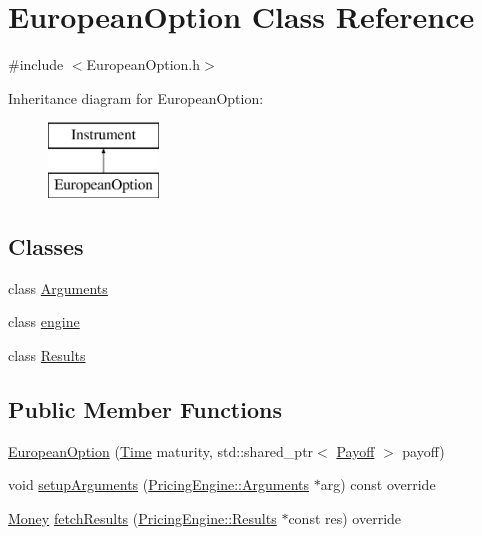 \hypertarget{class_european_option}{}\section{European\+Option Class Reference}
\label{class_european_option}


{\ttfamily \#include $<$European\+Option.\+h$>$}

Inheritance diagram for European\+Option\+:\begin{figure}[H]
\begin{center}
\leavevmode
\includegraphics[height=2.000000cm]{class_european_option}
\end{center}
\end{figure}
\subsection*{Classes}
\begin{DoxyCompactItemize}
\item 
class \hyperlink{class_european_option_1_1_arguments}{Arguments}
\item 
class \hyperlink{class_european_option_1_1engine}{engine}
\item 
class \hyperlink{class_european_option_1_1_results}{Results}
\end{DoxyCompactItemize}
\subsection*{Public Member Functions}
\begin{DoxyCompactItemize}
\item 
\hyperlink{class_european_option_a92132b61922cb628bc355d4d9f302513}{European\+Option} (\hyperlink{_name_def_8h_ac2d3e0ba793497bcca555c7c2cf64ff3}{Time} maturity, std\+::shared\+\_\+ptr$<$ \hyperlink{class_payoff}{Payoff} $>$ payoff)
\item 
void \hyperlink{class_european_option_a94c1826feba0099400bce8dd6fc01cb9}{setup\+Arguments} (\hyperlink{class_pricing_engine_1_1_arguments}{Pricing\+Engine\+::\+Arguments} $\ast$arg) const override
\item 
\hyperlink{_name_def_8h_a5a9d48c16a694e9a2d9f1eca730dc8c5}{Money} \hyperlink{class_european_option_ae234d562ef21dc24c25f1538860da1cf}{fetch\+Results} (\hyperlink{class_pricing_engine_1_1_results}{Pricing\+Engine\+::\+Results} $\ast$const res) override
\end{DoxyCompactItemize}
